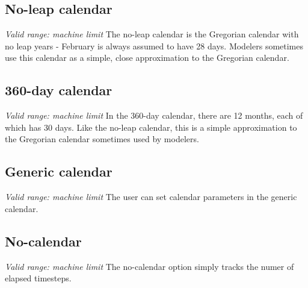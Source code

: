 \subsection{No-leap calendar}
{\it Valid range: machine limit} \newline
The no-leap calendar is the Gregorian calendar with no leap years - 
February is always assumed to have 28 days.  Modelers sometimes use this 
calendar as a simple, close approximation to the Gregorian calendar.

\subsection{360-day calendar}
{\it Valid range: machine limit} \newline
In the 360-day calendar, there are 12 months, each of which has 30 days.  
Like the no-leap calendar, this is a simple approximation to the Gregorian
calendar sometimes used by modelers.

\subsection{Generic calendar}
{\it Valid range: machine limit} \newline 
The user can set calendar parameters in the generic calendar.

\subsection{No-calendar}
{\it Valid range: machine limit} \newline 
The no-calendar option simply tracks the numer of elapsed timesteps.




